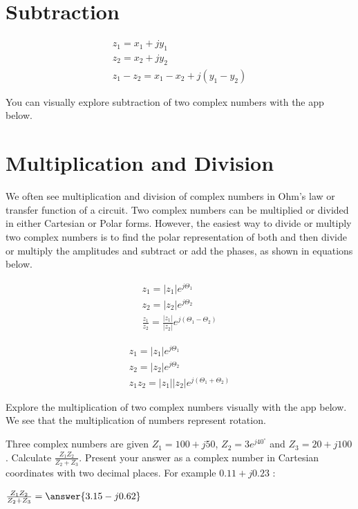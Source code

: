 \documentclass{ximera}
\begin{document}
\section{Subtraction}


\begin{eqnarray}
z_1=x_1 + j y_1 \nonumber \\
z_2=x_2 + j y_2 \nonumber \\
z_1-z_2 = x_1 - x_2 + j ( y_1 - y_2)
\end{eqnarray} 


You can visually explore subtraction of two complex numbers with the app below.
 \begin{center}  
\end{center} 

\section{Multiplication and Division}

We often see multiplication and division of complex numbers in  Ohm's law or transfer function of a circuit. Two complex numbers can be multiplied or divided in either Cartesian or Polar forms. However, the easiest way to divide or multiply two complex numbers is to find the polar representation of both and then divide or multiply the amplitudes and subtract or add the phases, as shown in equations below.



\begin{eqnarray}
z_1=|z_1| e^{j \Theta_1} \nonumber \\ 
z_2=|z_2| e^{j \Theta_2} \nonumber \\
\frac{z_1}{z_2} = \frac{|z_1|}{|z_2|} e^{j(\Theta_1-\Theta_2)}
\end{eqnarray}
  

\begin{eqnarray}
z_1=|z_1| e^{j \Theta_1} \nonumber \\
z_2=|z_2| e^{j \Theta_2} \nonumber \\
z_1 z_2 = |z_1||z_2| e^{j(\Theta_1+\Theta_2)}
\end{eqnarray}



Explore the multiplication of two complex numbers visually with the app below. We see that the multiplication of numbers represent rotation.

    
   
 \begin{center}  
\end{center} 
    
    
\begin{question}
Three complex numbers are given $Z_1=100+j50$, $Z_2=3e^{j40^\circ}$ and  $Z_3=20+j100$. Calculate $\frac{Z_1 Z_2}{Z_2+Z_3}$. Present your answer as a complex number in Cartesian coordinates with two decimal places. For example $0.11+j0.23$ :
  
$\frac{Z_1 Z_2}{Z_2+Z_3} = \answer{3.15-j0.62}$
\end{question} 
\end{document}
